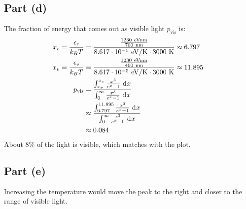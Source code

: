 \documentclass{article}
\begin{document}
\subsection*{Part (d)}
The fraction of energy that comes out as visible light $p_{\text{vis}}$ is:
\begin{equation}
    \begin{split}
        x_r = \frac{\epsilon_r}{k_BT} & = \frac{\frac{1230~\unit{eV\nano\meter}}{700~\unit{\nano\meter}}}{8.617 \cdot 10^{-5}~\unit{eV\per\kelvin} \cdot 3000~\unit{\kelvin}} \approx 6.797 \\
        x_v = \frac{\epsilon_v}{k_BT} & = \frac{\frac{1230~\unit{eV\nano\meter}}{400~\unit{\nano\meter}}}{8.617 \cdot 10^{-5}~\unit{eV\per\kelvin} \cdot 3000~\unit{\kelvin}}  \approx 11.895 \\
        p_{\text{vis}} & = \frac{\int_{x_r}^{x_v} \frac{x^3}{e^x - 1} \, \diff{x}}{\int_{0}^{\infty} \frac{x^3}{e^x - 1} \, \diff{x}} \\
        & \approx \frac{\int_{6.797}^{11.895} \frac{x^3}{e^x - 1} \, \diff{x}}{\int_{0}^{\infty} \frac{x^3}{e^x - 1} \, \diff{x}} \\
        & \approx 0.084
    \end{split}
\end{equation}
About $8\%$ of the light is visible, which matches with the plot.
\subsection*{Part (e)}
Increasing the temperature would move the peak to the right and closer to the range of visible light.

\clearpage
\end{document}
